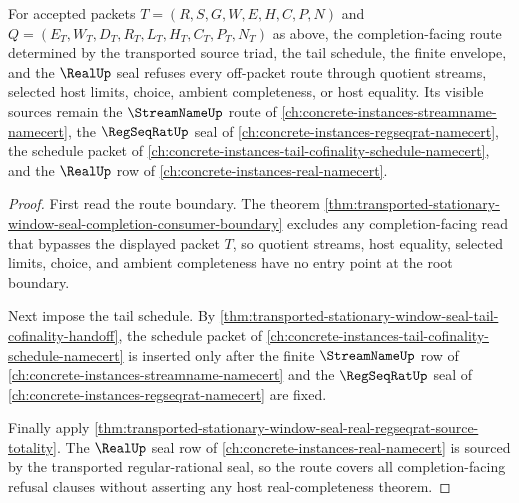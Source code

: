 \begin{theorem}
\label{thm:transported-stationary-window-seal-real-completion-refusal-cover}
For accepted packets $T=(R,S,G,W,E,H,C,P,N)$ and $Q=(E_T,W_T,D_T,R_T,L_T,H_T,C_T,P_T,N_T)$ as above, the completion-facing route determined by the transported source triad, the tail schedule, the finite envelope, and the $\RealUp$ seal refuses every off-packet route through quotient streams, selected host limits, choice, ambient completeness, or host equality. Its visible sources remain the $\StreamNameUp$ route of \autoref{ch:concrete-instances-streamname-namecert}, the $\RegSeqRatUp$ seal of \autoref{ch:concrete-instances-regseqrat-namecert}, the schedule packet of \autoref{ch:concrete-instances-tail-cofinality-schedule-namecert}, and the $\RealUp$ row of \autoref{ch:concrete-instances-real-namecert}.
\end{theorem}
\begin{proof}
First read the route boundary. The theorem \autoref{thm:transported-stationary-window-seal-completion-consumer-boundary} excludes any completion-facing read that bypasses the displayed packet $T$, so quotient streams, host equality, selected limits, choice, and ambient completeness have no entry point at the root boundary.

Next impose the tail schedule. By \autoref{thm:transported-stationary-window-seal-tail-cofinality-handoff}, the schedule packet of \autoref{ch:concrete-instances-tail-cofinality-schedule-namecert} is inserted only after the finite $\StreamNameUp$ row of \autoref{ch:concrete-instances-streamname-namecert} and the $\RegSeqRatUp$ seal of \autoref{ch:concrete-instances-regseqrat-namecert} are fixed.

Finally apply \autoref{thm:transported-stationary-window-seal-real-regseqrat-source-totality}. The $\RealUp$ seal row of \autoref{ch:concrete-instances-real-namecert} is sourced by the transported regular-rational seal, so the route covers all completion-facing refusal clauses without asserting any host real-completeness theorem.
\end{proof}
